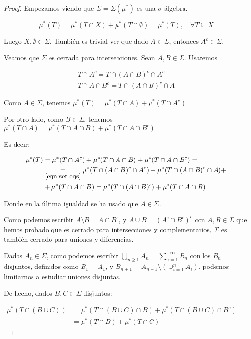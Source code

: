 \begin{proof}
 Empezamos viendo que $\Sigma = \Sigma(\mu^\ast)$ es una $\sigma$-álgebra.
 
 \[\mu^\ast(T) = \mu^\ast(T\cap X) + \mu^\ast(T\cap \emptyset) = \mu^\ast(T), \quad \forall T\subseteq X\]
 
 Luego $X,\emptyset \in \Sigma$. También es trivial ver que dado $A\in \Sigma$, entonces $A^c \in \Sigma$.
 
 Veamos que $\Sigma$ es cerrada para intersecciones. Sean $A, B\in \Sigma$. Usaremos:
 
 \begin{align}
  T\cap A^c = T\cap (A\cap B)^c \cap A^c \nonumber\\
  T\cap A \cap B^c = T \cap (A\cap B)^c \cap A
  \label{eqn:set-eqs}\tag{$\ast$}
 \end{align}

 Como $A\in \Sigma$, tenemos $\mu^\ast(T) = \mu^\ast(T\cap A) + \mu^\ast(T\cap A^c)$
 
 Por otro lado, como $B\in \Sigma$, tenemos $\mu^\ast(T\cap A) = \mu^\ast(T\cap A\cap B) + \mu^\ast(T\cap A \cap B^c)$
 
 Es decir:
 
 \begin{align*}
  \mu^\ast(T) &= \mu^\ast(T\cap A^c) + \mu^\ast(T\cap A \cap B) + \mu^\ast(T\cap A \cap B^c) = \\
  & \underset{\eqref{eqn:set-eqs}}{=} \mu^\ast(T\cap (A\cap B)^c \cap A^c) + \mu^\ast(T \cap (A\cap B)^c \cap A) +\\
  &+ \mu^\ast(T\cap A \cap B) = \mu^\ast(T\cap (A \cap B)^c) + \mu^\ast(T\cap A \cap B)
 \end{align*}

 Donde en la última igualdad se ha usado que $A\in \Sigma$.
 
 Como podemos escribir $A\setminus B = A\cap B^c$, y $A\cup B = (A^c \cap B^c)^c$ con $A, B \in \Sigma$ que
 hemos probado que es cerrado para intersecciones y complementarios, $\Sigma$ es también cerrado para
 uniones y diferencias.
 
 Dados $A_n \in \Sigma$, como podemos escribir $\bigcup_{n\ge 1} A_n = \sum_{n=1}^{+\infty} B_n$ con los $B_n$ 
 disjuntos, definidos como $B_1 = A_1$, y $B_{n+1} = A_{n+1} \setminus\left(\cup_{i=1}^n A_i\right)$, 
 podemos limitarnos a estudiar uniones disjuntas.
 
 De hecho, dados $B,C \in \Sigma$ disjuntos:
 
 \begin{align*}
  \mu^\ast(T \cap (B\cup C)) &= \mu^\ast(T \cap(B\cup C) \cap B) + \mu^\ast(T \cap(B\cup C) \cap B^c) =\\
                             &= \mu^\ast(T \cap B) + \mu^\ast(T \cap C)
 \end{align*}


\end{proof}

